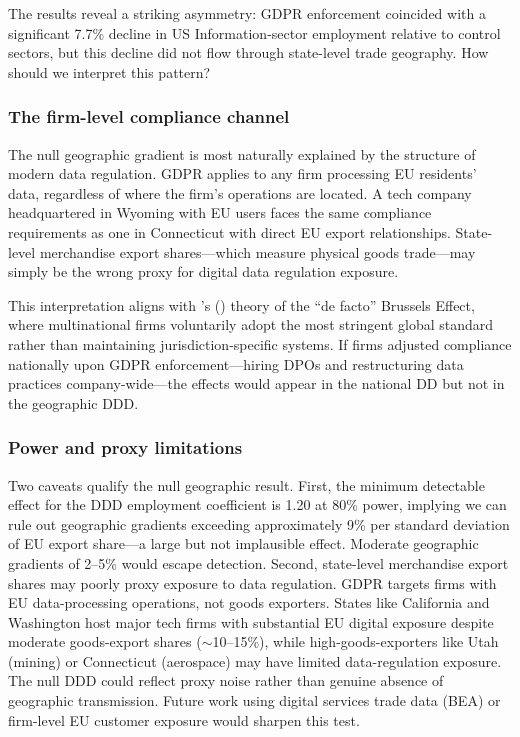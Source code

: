 \documentclass[12pt]{article}
\begin{document}
The results reveal a striking asymmetry: GDPR enforcement coincided with a significant 7.7\% decline in US Information-sector employment relative to control sectors, but this decline did not flow through state-level trade geography. How should we interpret this pattern?

\subsubsection*{The firm-level compliance channel} The null geographic gradient is most naturally explained by the structure of modern data regulation. GDPR applies to any firm processing EU residents' data, regardless of where the firm's operations are located. A tech company headquartered in Wyoming with EU users faces the same compliance requirements as one in Connecticut with direct EU export relationships. State-level merchandise export shares---which measure physical goods trade---may simply be the wrong proxy for digital data regulation exposure.

This interpretation aligns with \citeauthor{Bradford2020}'s (\citeyear{Bradford2020}) theory of the ``de facto'' Brussels Effect, where multinational firms voluntarily adopt the most stringent global standard rather than maintaining jurisdiction-specific systems. If firms adjusted compliance nationally upon GDPR enforcement---hiring DPOs and restructuring data practices company-wide---the effects would appear in the national DD but not in the geographic DDD.

\subsubsection*{Power and proxy limitations} Two caveats qualify the null geographic result. First, the minimum detectable effect for the DDD employment coefficient is 1.20 at 80\% power, implying we can rule out geographic gradients exceeding approximately 9\% per standard deviation of EU export share---a large but not implausible effect. Moderate geographic gradients of 2--5\% would escape detection. Second, state-level merchandise export shares may poorly proxy exposure to data regulation. GDPR targets firms with EU data-processing operations, not goods exporters. States like California and Washington host major tech firms with substantial EU digital exposure despite moderate goods-export shares ($\sim$10--15\%), while high-goods-exporters like Utah (mining) or Connecticut (aerospace) may have limited data-regulation exposure. The null DDD could reflect proxy noise rather than genuine absence of geographic transmission. Future work using digital services trade data (BEA) or firm-level EU customer exposure would sharpen this test.
\end{document}
